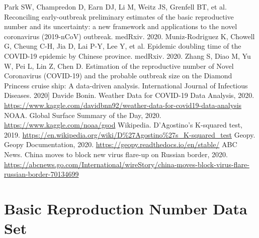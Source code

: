 \documentclass{article}
\begin{document}
\begin{thebibliography}{}
Park SW, Champredon D, Earn DJ, Li M, Weitz JS, Grenfell BT, et al. Reconciling early-outbreak preliminary estimates of the basic reproductive number and its uncertainty: a new framework and applications to the novel coronavirus (2019-nCoV) outbreak. medRxiv. 2020.
Muniz-Rodriguez K, Chowell G, Cheung C-H, Jia D, Lai P-Y, Lee Y, et al. Epidemic doubling time of the COVID-19 epidemic by Chinese province. medRxiv. 2020.
Zhang S, Diao M, Yu W, Pei L, Lin Z, Chen D. Estimation of the reproductive number of Novel Coronavirus (COVID-19) and the probable outbreak size on the Diamond
Princess cruise ship: A data-driven analysis. International Journal of Infectious Diseases. 2020]
Davide Bonin. Weather Data for COVID-19 Data Analysis, 2020.
\url{https://www.kaggle.com/davidbnn92/weather-data-for-covid19-data-analysis}
NOAA. Global Surface Summary of the Day, 2020.
\url{https://www.kaggle.com/noaa/gsod}
Wikipedia. D'Agostino's K-squared test, 2019.
\url{https://en.wikipedia.org/wiki/D\%27Agostino%27s_K-squared_test}
Geopy. Geopy Documentation, 2020.
\url{https://geopy.readthedocs.io/en/stable/}
ABC News. China moves to block new virus flare-up on Russian border, 2020.
\url{https://abcnews.go.com/International/wireStory/china-moves-block-virus-flare-russian-border-70134699}
\end{thebibliography}

\pagebreak
\appendixpage
\appendix
\section{Basic Reproduction Number Data Set}
\end{document}
